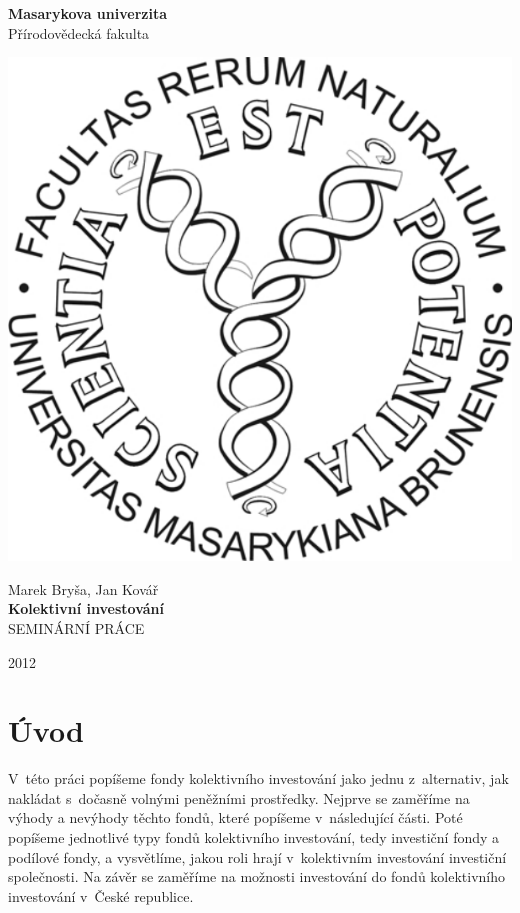 \documentclass[a4paper,12pt]{article}
\begin{document}
\thispagestyle{empty}
\vfill
\begin{center}
{\Large \bf Masarykova univerzita\\[1ex]}
{\large Přírodovědecká fakulta}
\end{center}
\vfill
\begin{center}
\includegraphics[scale=0.7]{prf_logo.pdf}
\end{center}
\begin{center}
\vfill

Marek Bryša, Jan Kovář\\[3em]
{\LARGE \bf Kolektivní investování}\\[1em]
SEMINÁRNÍ PRÁCE\\
\vfill

{2012}
\end{center}

\setcounter{page}{0}
\newpage

\tableofcontents
\newpage

\section*{Úvod}

V~této práci popíšeme fondy kolektivního investování jako jednu z~alternativ, jak nakládat s~dočasně volnými peněžními prostředky. Nejprve se zaměříme na výhody a nevýhody těchto fondů, které popíšeme v~následující části. Poté popíšeme jednotlivé typy fondů kolektivního investování, tedy investiční fondy a podílové fondy, a vysvětlíme, jakou roli hrají v~kolektivním investování investiční společnosti. Na závěr se zaměříme na možnosti investování do fondů kolektivního investování v~České republice.
\end{document}
